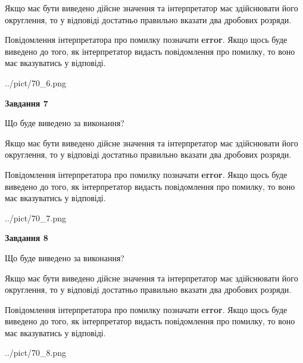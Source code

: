 \documentclass[12pt, ukrainian]{article}
\begin{document}
{\begin {Large}
Якщо має бути виведено дійсне значення та інтерпретатор має здійснювати його округлення, 
то у відповіді достатньо правильно вказати два дробових розряди.

Повідомлення інтерпретатора про помилку позначати \textbf{error}.
Якщо щось буде виведено до того, як інтерпретатор видасть повідомлення про помилку, 
то воно має вказуватись у відповіді. \par

\begin{center}
	{../pict/70_6.png}
\end{center}
\newpage

{\begin {center}\textbf{Завдання 7}\end {center}}\par
Що буде виведено за виконання? \par

Якщо має бути виведено дійсне значення та інтерпретатор має здійснювати його округлення, 
то у відповіді достатньо правильно вказати два дробових розряди.

Повідомлення інтерпретатора про помилку позначати \textbf{error}.
Якщо щось буде виведено до того, як інтерпретатор видасть повідомлення про помилку, 
то воно має вказуватись у відповіді. \par

\begin{center}
	{../pict/70_7.png}
\end{center}
\newpage

{\begin {center}\textbf{Завдання 8}\end {center}}\par
Що буде виведено за виконання? \par

Якщо має бути виведено дійсне значення та інтерпретатор має здійснювати його округлення, 
то у відповіді достатньо правильно вказати два дробових розряди.

Повідомлення інтерпретатора про помилку позначати \textbf{error}.
Якщо щось буде виведено до того, як інтерпретатор видасть повідомлення про помилку, 
то воно має вказуватись у відповіді. \par

\begin{center}
	{../pict/70_8.png}
\end{center}
\newpage


\end{Large}}
\end{document}
